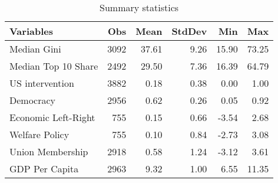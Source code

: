 \begin{table}[ht]
\caption{Summary statistics}
\centering
\begin{tabular}{lrrrrr}
\toprule
 Variables & Obs & Mean & StdDev & Min & Max \\ 
  \midrule
 Median Gini & 3092 & 37.61 & 9.26 & 15.90 & 73.25 \\ 
   Median Top 10 Share & 2492 & 29.50 & 7.36 & 16.39 & 64.79 \\ 
   US intervention & 3882 & 0.18 & 0.38 & 0.00 & 1.00 \\ 
   Democracy & 2956 & 0.62 & 0.26 & 0.05 & 0.92 \\ 
   Economic Left-Right & 755 & 0.15 & 0.66 & -3.54 & 2.68 \\ 
   Welfare Policy & 755 & 0.10 & 0.84 & -2.73 & 3.08 \\ 
   Union Membership & 2918 & 0.58 & 1.24 & -3.12 & 3.61 \\ 
   GDP Per Capita & 2963 & 9.32 & 1.00 & 6.55 & 11.35 \\ 
   \bottomrule
\end{tabular}

\end{table}